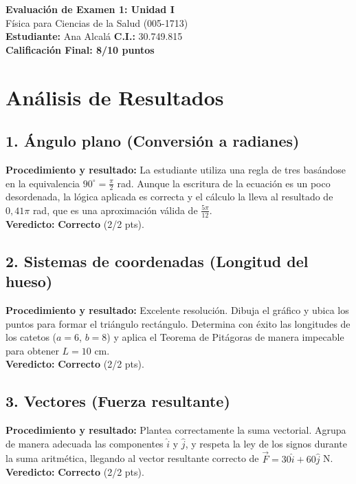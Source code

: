 \documentclass[12pt]{article}
\begin{document}
\begin{center}
    \Large \textbf{Evaluación de Examen 1: Unidad I} \\
    \large Física para Ciencias de la Salud (005-1713) \\
    \vspace{0.5cm}
    \textbf{Estudiante:} Ana Alcalá \quad \textbf{C.I.:} 30.749.815
    \vspace{0.3cm} \\
    \large \textbf{Calificación Final: 8/10 puntos}
\end{center}

\vspace{0.5cm}

\section*{Análisis de Resultados}

\subsection*{1. Ángulo plano (Conversión a radianes)}
\textbf{Procedimiento y resultado:} La estudiante utiliza una regla de tres basándose en la equivalencia $90^\circ = \frac{\pi}{2}$ rad. Aunque la escritura de la ecuación es un poco desordenada, la lógica aplicada es correcta y el cálculo la lleva al resultado de $0,41\pi$ rad, que es una aproximación válida de $\frac{5\pi}{12}$. \\
\textbf{Veredicto:} \textbf{Correcto} (2/2 pts).

\subsection*{2. Sistemas de coordenadas (Longitud del hueso)}
\textbf{Procedimiento y resultado:} Excelente resolución. Dibuja el gráfico y ubica los puntos para formar el triángulo rectángulo. Determina con éxito las longitudes de los catetos ($a=6$, $b=8$) y aplica el Teorema de Pitágoras de manera impecable para obtener $L = 10$ cm. \\
\textbf{Veredicto:} \textbf{Correcto} (2/2 pts).

\subsection*{3. Vectores (Fuerza resultante)}
\textbf{Procedimiento y resultado:} Plantea correctamente la suma vectorial. Agrupa de manera adecuada las componentes $\hat{i}$ y $\hat{j}$, y respeta la ley de los signos durante la suma aritmética, llegando al vector resultante correcto de $\vec{F} = 30\hat{i} + 60\hat{j}$ N. \\
\textbf{Veredicto:} \textbf{Correcto} (2/2 pts).
\end{document}
